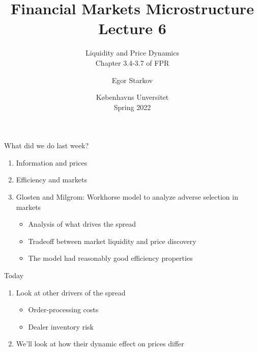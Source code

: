 \documentclass[english,10pt
,aspectratio=169
]{beamer}
\title{Financial Markets Microstructure \\ Lecture 6}
\subtitle{Liquidity and Price Dynamics\\
Chapter 3.4-3.7 of FPR}
\author{Egor Starkov}
\date{K{\o}benhavns Unversitet \\
	Spring 2022}
\begin{document}
	

\frame[plain]{\titlepage}



\begin{frame}{What did we do last week?}
\begin{enumerate}
	\item Information and prices
	\item Efficiency and markets
	\item Glosten and Milgrom: Workhorse model to analyze adverse selection in markets
	\begin{itemize}
	\item Analysis of what drives the spread
	\item Tradeoff between market liquidity and price discovery
	\item The model had reasonably good efficiency properties
	\end{itemize}
\end{enumerate}
\end{frame}




\begin{frame}{Today}
\begin{enumerate}
	\item Look at other drivers of the spread
	\begin{itemize}
		\item Order-processing costs
		\item Dealer inventory risk
	\end{itemize}
	\item We'll look at how their dynamic effect on prices differ
\end{enumerate}
\end{frame}
\end{document}
